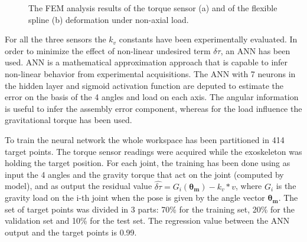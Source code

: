 \documentclass[journal]{IEEEtran}
\newcommand{\vect}[1]{\mathbf{#1}}
\begin{document}
\begin{figure}[]
	\centering
	\caption{The FEM analysis results of the torque sensor (a) and of the flexible spline (b) deformation under non-axial load.}
\end{figure}
%
%
For all the three sensors the $k_v$ constants have been experimentally evaluated. In order to minimize the effect of non-linear undesired term $\delta\tau$,  an ANN has been used. ANN is a mathematical approximation approach that is capable to infer non-linear behavior from experimental acquisitions. The ANN with 7 neurons in the hidden layer and sigmoid activation function are deputed to estimate the error on the basis of the 4 angles and load on each axis. The angular information is useful to infer the assembly error component, whereas for the load influence the gravitational torque has been used. 
\par To train the neural network the whole workspace has been partitioned in 414 target points. The torque sensor readings were acquired while the exoskeleton was holding the target position. For each joint, the training has been done using as input the 4 angles and the gravity torque that act on the joint (computed by model), and as output the residual value $\hat{\delta\tau} = G_i(\vect{\theta_m}) - k_v * v$, where $G_i$ is the gravity load on the i-th joint when the pose is given by the angle vector $\vect{\theta_m}$. The set of target points was divided in 3 parts: 70\% for the training set, 20\% for the validation set and 10\% for the test set. The regression value between the ANN output and the target points is 0.99.
\end{document}
